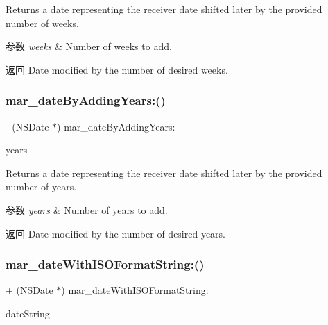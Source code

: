 Returns a date representing the receiver date shifted later by the provided number of weeks.


\begin{DoxyParams}{参数}
{\em weeks} & Number of weeks to add. \\
\hline
\end{DoxyParams}
\begin{DoxyReturn}{返回}
Date modified by the number of desired weeks. 
\end{DoxyReturn}
\mbox{\label{category_n_s_date_07_m_a_r_e_x_08_a7d4254896b6694464753583d55b11d2e}} 
\subsubsection{\texorpdfstring{mar\+\_\+date\+By\+Adding\+Years\+:()}{mar\_dateByAddingYears:()}}
{\footnotesize\ttfamily -\/ (N\+S\+Date $\ast$) mar\+\_\+date\+By\+Adding\+Years\+: \begin{DoxyParamCaption}\item[{(N\+S\+Integer)}]{years }\end{DoxyParamCaption}}

Returns a date representing the receiver date shifted later by the provided number of years.


\begin{DoxyParams}{参数}
{\em years} & Number of years to add. \\
\hline
\end{DoxyParams}
\begin{DoxyReturn}{返回}
Date modified by the number of desired years. 
\end{DoxyReturn}
\mbox{\label{category_n_s_date_07_m_a_r_e_x_08_ab215c93e1958da9cac1d131e107d1e07}} 
\subsubsection{\texorpdfstring{mar\+\_\+date\+With\+I\+S\+O\+Format\+String\+:()}{mar\_dateWithISOFormatString:()}}
{\footnotesize\ttfamily + (N\+S\+Date $\ast$) mar\+\_\+date\+With\+I\+S\+O\+Format\+String\+: \begin{DoxyParamCaption}\item[{(N\+S\+String $\ast$)}]{date\+String }\end{DoxyParamCaption}}

